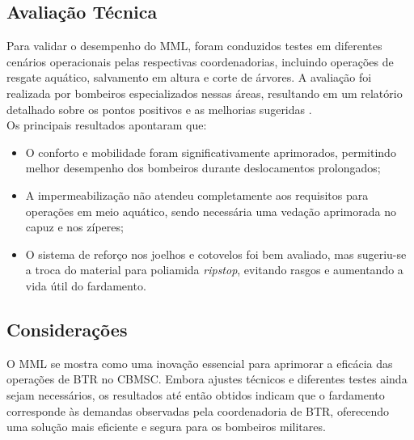 \begin{centering}
\end{centering}

\subsection{Avaliação Técnica}

Para validar o desempenho do \acrlong{MML}, foram conduzidos testes em diferentes cenários operacionais pelas respectivas coordenadorias, incluindo operações de resgate aquático, salvamento em altura e corte de árvores. A avaliação foi realizada por bombeiros especializados nessas áreas, resultando em um relatório detalhado sobre os pontos positivos e as melhorias sugeridas \cite{relMML}.
\\
Os principais resultados apontaram que:
\begin{itemize}
    \item O conforto e mobilidade foram significativamente aprimorados, permitindo melhor desempenho dos bombeiros durante deslocamentos prolongados;
    \item A impermeabilização não atendeu completamente aos requisitos para operações em meio aquático, sendo necessária uma vedação aprimorada no capuz e nos zíperes;
    \item O sistema de reforço nos joelhos e cotovelos foi bem avaliado, mas sugeriu-se a troca do material para poliamida \textit{ripstop}, evitando rasgos e aumentando a vida útil do fardamento.
\end{itemize}

    

\subsection{Considerações}
O \acrlong{MML} se mostra como uma inovação essencial para aprimorar a eficácia das operações de \acrlong{BTR} no \acrshort{CBMSC}. Embora ajustes técnicos e diferentes testes ainda sejam necessários, os resultados até então obtidos indicam que o fardamento corresponde às demandas observadas pela coordenadoria de \acrshort{BTR}, oferecendo uma solução mais eficiente e segura para os bombeiros militares.
